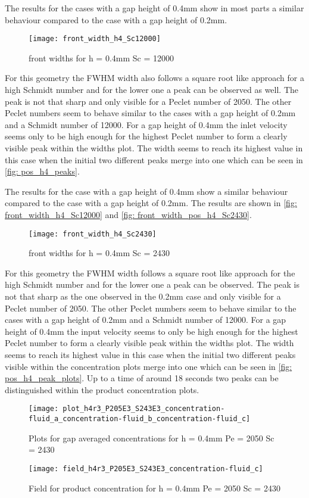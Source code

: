 \documentclass[../thesis.tex]{subfiles}
\begin{document}
The results for the cases with a gap height of 0.4mm show in most parts a similar behaviour compared to the case with a gap height of 0.2mm.
\begin{figure}[htbp]
	\centering
	\texttt{[image: front\_width\_h4\_Sc12000]}
	\caption{front widths for  h = 0.4mm Sc = 12000
	\label{fig: front_width_h4_Sc12000}}
\end{figure} 
For this geometry the FWHM width also follows a square root like approach for a high Schmidt number and for the lower one a peak can be observed as well. The peak is not that sharp and only visible for a Peclet number of 2050. The other Peclet numbers seem to behave similar to the cases with a gap height of 0.2mm and a Schmidt number of 12000. For a gap height of 0.4mm the inlet velocity seems only to be high enough for the highest Peclet number to form a clearly visible peak within the widths plot. The width seems to reach its highest value in this case when the initial two different peaks merge into one which can be seen in \autoref{fig: pos_h4_peaks}.

The results for the case with a gap height of 0.4mm show a similar behaviour compared to the case with a gap height of 0.2mm. The results are shown in \autoref{fig: front_width_h4_Sc12000} and \autoref{fig: front_width_pos_h4_Sc2430}.
\begin{figure}[htbp]
	\centering
	\texttt{[image: front\_width\_h4\_Sc2430]}
	\caption{front widths for  h = 0.4mm Sc = 2430
	\label{fig: front_width_pos_h4_Sc2430}}
\end{figure}
For this geometry the FWHM width follows a square root like approach for the high Schmidt number and for the lower one a peak can be observed. The peak is not that sharp as the one observed in the 0.2mm case and only visible for a Peclet number of 2050. The other Peclet numbers seem to behave similar to the cases with a gap height of 0.2mm and a Schmidt number of 12000. For a gap height of 0.4mm the input velocity seems to only be high enough for the highest Peclet number to form a clearly visible peak within the widths plot. The width seems to reach its highest value in this case when the initial two different peaks visible within the concentration plots merge into one which can be seen in \autoref{fig: pos_h4_peak_plots}. Up to a time of around 18 seconds two peaks can be distinguished within the product concentration plots. 

\begin{figure}[htbp]
	\centering
	\texttt{[image: plot\_h4r3\_P205E3\_S243E3\_concentration-fluid\_a\_concentration-fluid\_b\_concentration-fluid\_c]}
	\caption{Plots for gap averaged concentrations for h = 0.4mm Pe = 2050 Sc = 2430}
	\label{fig: pos_h4_peak_plots}
\end{figure}
\begin{figure}[htbp]
	\centering
	\texttt{[image: field\_h4r3\_P205E3\_S243E3\_concentration-fluid\_c]}
	\caption{Field for product concentration for h = 0.4mm Pe = 2050 Sc = 2430}
	\label{fig: pos_h4_peak_fields}
\end{figure}
\end{document}
